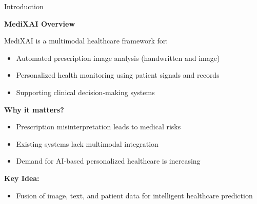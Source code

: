 \documentclass[11pt,aspectratio=169]{beamer}
\begin{document}
\begin{frame}{Introduction}

\textbf{MediXAI Overview}

\vspace{0.3cm}

MediXAI is a multimodal healthcare framework for:
\begin{itemize}
    \item Automated prescription image analysis (handwritten and image)
    \item Personalized health monitoring using patient signals and records
    \item Supporting clinical decision-making systems
\end{itemize}

\vspace{0.4cm}

\textbf{Why it matters?}
\begin{itemize}
    \item Prescription misinterpretation leads to medical risks
    \item Existing systems lack multimodal integration
    \item Demand for AI-based personalized healthcare is increasing
\end{itemize}

\vspace{0.4cm}

\textbf{Key Idea:}
\begin{itemize}
    \item Fusion of image, text, and patient data for intelligent healthcare prediction
\end{itemize}

\end{frame}
\end{document}

